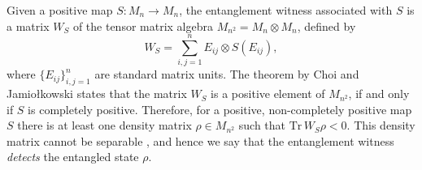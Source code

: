 \documentclass[12pt]{article}
\theoremstyle{plain}
\theoremstyle{definition}
\theoremstyle{remark}
\numberwithin{equation}{section}
\begin{document}
\vspace{0.5cm}

Given a positive map $S: M_{n} \rightarrow M_{n}$,
the entanglement witness associated with $S$ is a matrix $W_{S}$
of the tensor matrix algebra $M_{n^{2}} = M_{n} \! \otimes \! M_{n}$,
defined by
\begin{equation}
\label{def:entanglement-witness}
    W_{S} = \sum \limits_{i,j =1}^{n} E_{ij} \otimes S(E_{ij}),
\end{equation}
where $\{ E_{ij}\}_{i,j=1}^{n}$ are standard matrix units.
The theorem by Choi and Jamiołkowski \cite{choi1975completely,jamiolkowski1974effective}
states that the matrix $W_{S}$ is a positive element of $M_{n^{2}}$,
if and only if $S$ is completely positive.
Therefore, for a positive, non-completely positive map $S$
there is at least one density matrix $\rho \in M_{n^{2}}$
such that $\text{Tr}\, W_{S} \rho < 0$.
This density matrix cannot be separable \cite{werner1989quantum},
and hence we say that the entanglement witness \emph{detects} the
entangled state $\rho$. 
\end{document}
